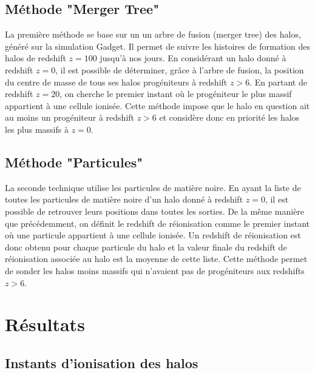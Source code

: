 \subsection{Méthode "Merger Tree"}
La première méthode se base sur un un arbre de fusion (merger tree) des halos, généré sur la simulation Gadget.
Il permet de suivre les histoires de formation des halos de redshift $z=100$ jusqu'à nos jours.
En considérant un halo donné à redshift $z=0$, il est possible de déterminer, grâce à l'arbre de fusion, la position du centre de masse de tous ses halos progéniteurs à redshift $z>6$.
En partant de redshift $z=20$, on cherche le premier instant où le progéniteur le plus massif appartient à une cellule ionisée.
Cette méthode impose que le halo en question ait au moins un progéniteur à redshift $z>6$ et considère donc en priorité les halos les plus massifs à $z=0$.

\subsection{Méthode "Particules"}
La seconde technique utilise les particules de matière noire.
En ayant la liste de toutes les particules de matière noire d'un halo donné à redshift $z=0$, il est possible de retrouver leurs positions dans toutes les sorties.
De la même manière que précédemment, on définit le redshift de réionisation comme le premier instant où une particule appartient à une cellule ionisée.
Un redshift de réionisation est donc obtenu pour chaque particule du halo et la valeur finale du redshift de réionisation associée au halo est la moyenne de cette liste.
Cette méthode permet de sonder les halos moins massifs qui n'avaient pas de progéniteurs aux redshifts $z>6$.

\section{Résultats}


\subsection{Instants d'ionisation des halos}


